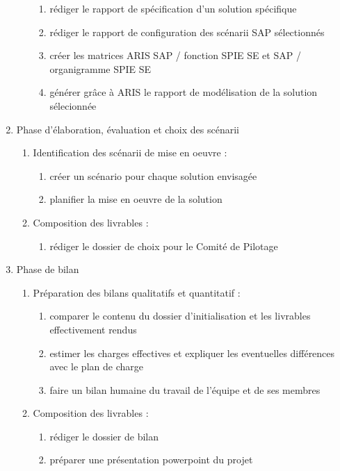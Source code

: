 \begin{enumerate}
\begin{enumerate}
\begin{enumerate}
                  \item rédiger le rapport de spécification d'un solution spécifique 
                  \item rédiger le rapport de configuration des scénarii SAP sélectionnés
                  \item créer les matrices ARIS SAP / fonction SPIE SE et SAP / organigramme SPIE SE
                  \item générer grâce à ARIS le rapport de modélisation de la solution sélecionnée
                \end{enumerate}
          \end{enumerate}

    \item Phase d'élaboration, évaluation et choix des scénarii

          \begin{enumerate}
            \item Identification des scénarii de mise en oeuvre : 
                \begin{enumerate}
                  \item créer un scénario pour chaque solution envisagée
                  \item planifier la mise en oeuvre de la solution
                \end{enumerate}
            \item Composition des livrables : 
                \begin{enumerate}
                  \item rédiger le dossier de choix pour le Comité de Pilotage
                \end{enumerate}
          \end{enumerate}

\item Phase de bilan

          \begin{enumerate}
            \item Préparation des bilans qualitatifs et quantitatif : 
                \begin{enumerate}
                  \item comparer le contenu du dossier d'initialisation et les livrables effectivement rendus
                  \item estimer les charges effectives et expliquer les eventuelles différences avec le plan de charge
                  \item faire un bilan humaine du travail de l'équipe et de ses membres
                \end{enumerate}
            \item Composition des livrables : 
                \begin{enumerate}
                  \item rédiger le dossier de bilan
                  \item préparer une présentation powerpoint du projet
                \end{enumerate}
          \end{enumerate}

\end{enumerate}
